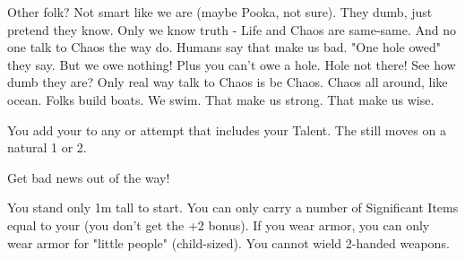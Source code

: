 {\newpage







  Other folk? Not smart like we are (maybe Pooka, not sure).  They dumb, just pretend they know.  Only we know truth - Life and Chaos are same-same.  And no one talk to Chaos the way  do. Humans say that make us bad. "One hole owed" they say.  But we owe nothing! Plus you can't owe a hole. Hole not there! See how dumb they are? Only real way talk to Chaos is be Chaos.  Chaos all around, like ocean. Folks build boats.  We swim.  That make us strong. That make us wise.


  


  You add your \LVL to any \RO or \RB attempt that includes your Talent.  The \UD still moves \DCDOWN on a natural 1 or 2.

  \cbreak


    Get bad news out of the way!

  
  You stand only 1m tall to start.  You can only carry a number of Significant Items equal to your \MAX \VIG (you don't get the +2 bonus). If you wear armor, you can only wear armor for "little people" (child-sized).  You cannot wield 2-handed weapons.

}
